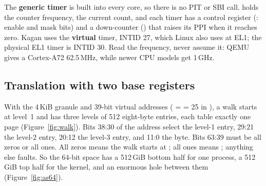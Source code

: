\documentclass[11pt,a4paper]{article}
\begin{document}
The \textbf{generic timer} is built into every core, so there is no PIT or SBI call.  holds the
counter frequency,  the current count, and each timer has a control register (:
enable and mask bits) and a down-counter () that raises its PPI when it reaches zero. Kagan uses
the \textbf{virtual} timer, INTID 27, which Linux also uses at EL1; the physical EL1 timer is INTID 30. Read the
frequency, never assume it: QEMU gives a Cortex-A72 62.5\,MHz, while newer CPU models get 1\,GHz.

\subsection{Translation with two base registers}

With the 4\,KiB granule and 39-bit virtual addresses ( =  = 25 in ), a walk starts
at level~1 and has three levels of 512 eight-byte entries, each table exactly one page (Figure~\ref{fig:walk}). Bits
38:30 of the address select the level-1 entry, 29:21 the level-2 entry, 20:12 the level-3 entry, and 11:0 the byte.
Bits 63:39 must be all zeros or all ones. All zeros means the walk starts at ; all ones means
; anything else faults. So the 64-bit space has a 512\,GiB bottom half for one process, a 512\,GiB
top half for the kernel, and an enormous hole between them (Figure~\ref{fig:as64}).
\end{document}

